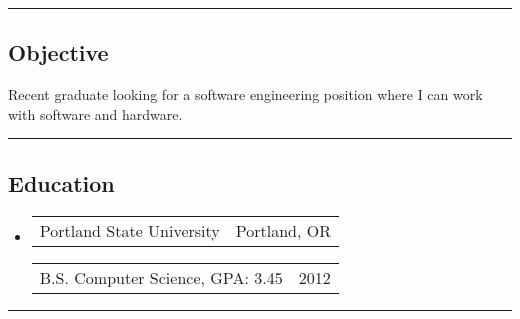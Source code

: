 \documentclass[10pt,letterpaper]{article}
\author{Eric Dinger}
\makeatletter
\newcommand{\heading}[2]
{\begin{tabular*}{\linewidth}{l@{\extracolsep{\fill}}r}
#1 &
#2 \\
\end{tabular*}}
\makeatother
\begin{document}
 \renewcommand*\arraystretch{1.5}


\hrule
\vspace{-.4em}

\subsection*{Objective}
Recent graduate looking for a software engineering position where I can work with software and hardware.\\

\vspace{.4em}
\hrule
\vspace{-.2em}

\subsection*{Education}
	\begin{itemize}
	\item
		\heading
			{Portland State University}
			{Portland, OR}

		\vspace{-1em}
		\heading 
			{ B.S. Computer Science, GPA: 3.45}
			{2012}
	\end{itemize}

\hrule
\end{document}
